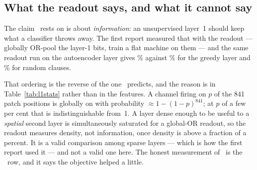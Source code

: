 \subsection{What the readout says, and what it cannot say}
\label{sec:readout}

The claim \ideaA\ rests on is about \emph{information}: an unsupervised layer~1 should keep
what a classifier throws away. The first report measured that with the 
readout --- globally OR-pool the layer-1 bits, train a flat machine on them --- and the same
readout run on the autoencoder layer gives \accFlatAuto{}\% against \accFlatStack{}\% for the
greedy layer and \accFlatRandom{}\% for random clauses.

That ordering is the reverse of the one \ideaA\ predicts, and the reason is in
Table~\ref{tab:l1stats} rather than in the features. A channel firing on $p$ of the 841 patch
positions is globally on with probability $\approx 1-(1-p)^{841}$; at $p$ of a few per cent
that is indistinguishable from~1. A layer dense enough to be useful to a \emph{spatial} second
layer is simultaneously saturated for a global-OR readout, so the readout measures density,
not information, once density is above a fraction of a percent. It is a valid comparison among
sparse layers --- which is how the first report used it --- and not a valid one here. The
honest measurement of \ideaA\ is the \mctm\ row, and it says the objective helped a little.
